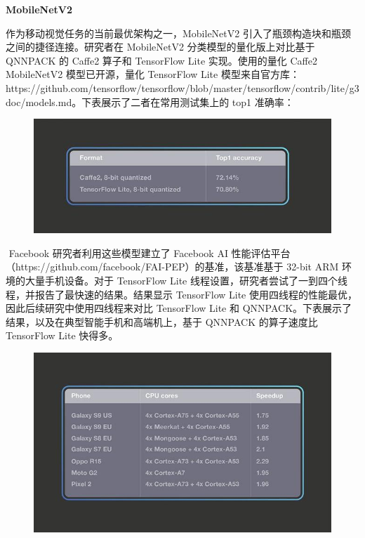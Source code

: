 \textbf{MobileNetV2}

作为移动视觉任务的当前最优架构之一，MobileNetV2
引入了瓶颈构造块和瓶颈之间的捷径连接。研究者在 MobileNetV2
分类模型的量化版上对比基于 QNNPACK 的 Caffe2 算子和 TensorFlow Lite
实现。使用的量化 Caffe2 MobileNetV2 模型已开源，量化 TensorFlow Lite
模型来自官方库：https://github.com/tensorflow/tensorflow/blob/master/tensorflow/contrib/lite/g3doc/models.md。下表展示了二者在常用测试集上的
top1 准确率：

\begin{figure}
\centering
\includegraphics{./img/ch17/mv2.jpg}
\caption{}
\end{figure}

​ Facebook 研究者利用这些模型建立了 Facebook AI
性能评估平台（https://github.com/facebook/FAI-PEP）的基准，该基准基于
32-bit ARM 环境的大量手机设备。对于 TensorFlow Lite
线程设置，研究者尝试了一到四个线程，并报告了最快速的结果。结果显示
TensorFlow Lite 使用四线程的性能最优，因此后续研究中使用四线程来对比
TensorFlow Lite 和
QNNPACK。下表展示了结果，以及在典型智能手机和高端机上，基于 QNNPACK
的算子速度比 TensorFlow Lite 快得多。

\begin{figure}
\centering
\includegraphics{./img/ch17/mv3.jpg}
\caption{}
\end{figure}

